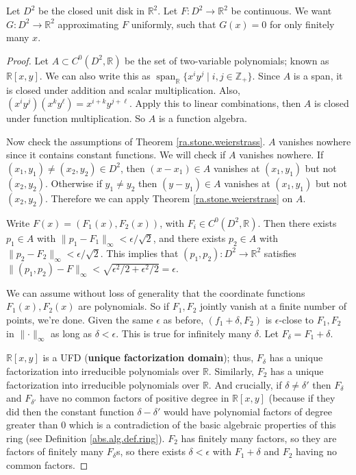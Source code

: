 \begin{example}

Let \(D^2\) be the closed unit disk in \(\mathbb{R}^2\). Let \(F: D^2 \to \mathbb{R}^2\) be continuous. We want \(G: D^2 \to \mathbb{R}^2\) approximating \(F\) uniformly, such that \(G(x) = 0\) for only finitely many \(x\). 

\begin{proof}

Let \(A \subset C^0(D^2, \mathbb{R})\) be the set of two-variable polynomials; known as \(\mathbb{R}[x,y]\). We can also write this as \(\operatorname{span}_\mathbb{R}\{x^i y^j \mid i, j \in \mathbb{Z}_+\}\). Since \(A\) is a span, it is closed under addition and scalar multiplication. Also, \((x^i y^j)(x^k y^\ell) = x^{i+k} y^{j+\ell}\). Apply this to linear combinations, then \(A\) is closed under function multiplication. So \(A\) is a function algebra.

Now check the assumptions of Theorem \ref{ra.stone.weierstrass}. \(A\) vanishes nowhere since it contains constant functions. We will check if \(A\) vanishes nowhere. If \( (x_1, y_1) \neq (x_2, y_2) \in D^2\), then \((x - x_1) \in A\) vanishes at \((x_1, y_1)\) but not \((x_2, y_2)\). Otherwise if \(y_1 \neq y_2\) then \((y - y_1) \in A\) vanishes at \((x_1, y_1)\) but not \((x_2, y_2)\). Therefore we can apply Theorem \ref{ra.stone.weierstrass} on \(A\).

Write \(F(x) = (F_1(x), F_2(x))\), with \(F_i \in C^0(D^2, \mathbb{R})\). Then there exists \(p_1 \in A\) with \(\lVert p_1 - F_1 \rVert_\infty < \epsilon/\sqrt{2}\), and there exists \(p_2 \in A\) with \(\lVert p_2 - F_2 \rVert_\infty < \epsilon/\sqrt{2}\). This implies that \((p_1, p_2): D^2 \to \mathbb{R}^2\) satisfies \(\lVert (p_1, p_2) - F \rVert_\infty < \sqrt{\epsilon^2/2 + \epsilon^2/2 } = \epsilon\). 

We can assume without loss of generality that the coordinate functions \(F_1(x), F_2(x)\) are polynomials. So if \(F_1, F_2\) jointly vanish at a finite number of points, we're done. Given the same \(\epsilon\) as before, \((f_1 + \delta, F_2)\) is \(\epsilon\)-close to \(F_1, F_2\) in \(\lVert \cdot \rVert_\infty\) as long as \(\delta < \epsilon\). This is true for infinitely many \(\delta\). Let \(F_\delta = F_1 + \delta\).

\(\mathbb{R}[x,y]\) is a UFD (\textbf{unique factorization domain}); thus, \(F_\delta\) has a unique factorization into irreducible polynomials over \(\mathbb{R}\). Similarly, \(F_2\) has a unique factorization into irreducible polynomials over \(\mathbb{R}\). And crucially, if \(\delta \neq \delta'\) then \(F_\delta\) and \(F_{\delta'}\) have no common factors of positive degree in \(\mathbb{R}[x,y]\) (because if they did then the constant function \(\delta - \delta'\) would have polynomial factors of degree greater than 0 which is a contradiction of the basic algebraic properties of this ring (see Definition \ref{abs.alg.def.ring}). \(F_2\) has finitely many factors, so they are factors of finitely many \(F_\delta\)s, so there exists \(\delta < \epsilon\) with \(F_1 + \delta\) and \(F_2\) having no common factors.


\end{proof}
\end{example}
